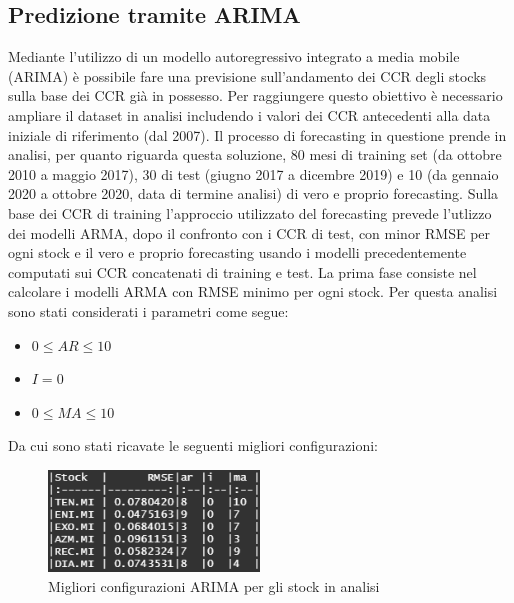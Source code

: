 \documentclass[12pt]{article}
\begin{document}
\subsection{Predizione tramite ARIMA}
Mediante l'utilizzo di un modello autoregressivo integrato a media mobile (ARIMA) è possibile fare una previsione sull'andamento dei CCR degli stocks sulla base dei CCR già in possesso. Per raggiungere questo obiettivo è necessario ampliare il dataset in analisi includendo i valori dei CCR antecedenti alla data iniziale di riferimento (dal 2007). Il processo di forecasting in questione prende in analisi, per quanto riguarda questa soluzione, 80 mesi di training set (da ottobre 2010 a maggio 2017), 30 di test (giugno 2017 a dicembre 2019) e 10 (da gennaio 2020 a ottobre 2020, data di termine analisi) di vero e proprio forecasting. Sulla base dei CCR di training l'approccio utilizzato del forecasting prevede l'utlizzo dei modelli ARMA, dopo il confronto con i CCR di test, con minor RMSE per ogni stock e il vero e proprio forecasting usando i modelli precedentemente computati sui CCR concatenati di training e test. La prima fase consiste nel calcolare i modelli ARMA con RMSE minimo per ogni stock. Per questa analisi sono stati considerati i parametri come segue:
\begin{itemize}
    \item $0\leq AR \leq 10$
    \item $I=0$
    \item $0\leq MA \leq 10$
\end{itemize}
Da cui sono stati ricavate le seguenti migliori configurazioni:
\begin{figure}[!htb]
    \centering
    \includegraphics[width=0.5\textwidth]{immagini/rmse.png}
    \caption{Migliori configurazioni ARIMA per gli stock in analisi}
\end{figure}
\FloatBarrier
\end{document}
